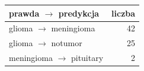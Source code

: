 \begin{tabular}{lr}
\toprule
prawda $\rightarrow$ predykcja & liczba \\
\midrule
glioma $\rightarrow$ meningioma & 42 \\
glioma $\rightarrow$ notumor & 25 \\
meningioma $\rightarrow$ pituitary & 2 \\
\bottomrule
\end{tabular}
